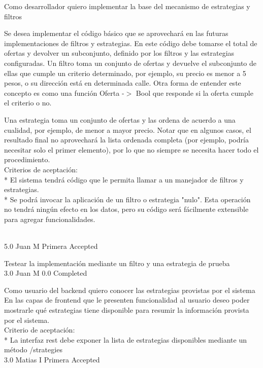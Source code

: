 	{Como desarrollador quiero implementar la base del mecanismo de estrategias y filtros} %
	{Se desea implementar el código básico que se aprovechará en las futuras
implementaciones de filtros y estrategias.
En este código debe tomarse el total de ofertas y devolver un subconjunto,
definido por los filtros y  las estrategias configuradas.
Un filtro toma un conjunto de ofertas y devuelve el subconjunto de ellas que
cumple un criterio determinado, por ejemplo, su precio es menor a 5 pesos, o
su dirección está en determinada calle. Otra forma de entender este concepto
es como una función Oferta -$>$  Bool que responde si la oferta cumple el
criterio o no.

Una estrategia toma un conjunto de ofertas y las ordena de acuerdo a una
cualidad, por ejemplo, de menor a mayor precio. Notar que en algunos casos, el
resultado final no aprovechará la lista ordenada completa (por ejemplo, podría
necesitar solo el primer elemento), por lo que no siempre se necesita hacer
todo el procedimiento.
  \\
Criterios de aceptación:\\
* El sistema tendrá código que le permita llamar a un manejador de filtros y estrategias.  \\
* Se podrá invocar la aplicación de un filtro o estrategia "nulo". Esta operación no tendrá ningún efecto en los datos, pero su código será fácilmente extensible para agregar funcionalidades.  \\
  \\
} %
	{} %
	{5.0} %
	{Juan M} %
	{Primera} %
	{Accepted} %

		{Testear la implementación mediante un filtro y una estrategia de prueba} %
		{\\
} %
		{3.0} %
		{Juan M} %
		{0.0} %
		{Completed} %


\vspace{20pt}

	{Como usuario del backend quiero conocer las estrategias provistas por el sistema} %
	{En las capas de frontend que le presenten funcionalidad al usuario deseo poder
mostrarle qué estrategias tiene disponible para resumir la información
provista por el sistema.
  \\
Criterio de aceptación:\\
* La interfaz rest debe exponer la lista de estrategias disponibles mediante un método /strategies\\
} %
	{} %
	{3.0} %
	{Matias I} %
	{Primera} %
	{Accepted} %


